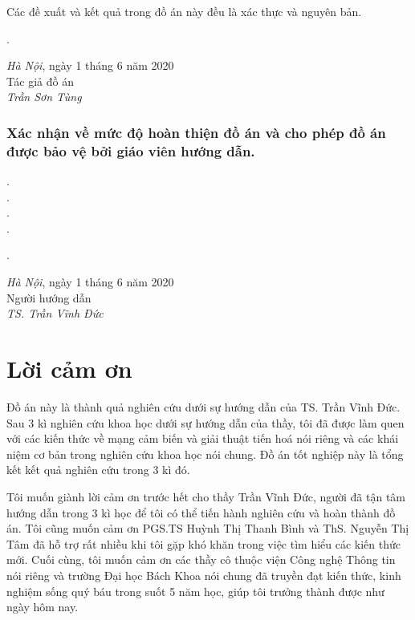 \documentclass{hust}
\begin{document}
Các đề xuất và kết quả trong đồ án này đều là xác thực và nguyên bản.
\begin{minipage}{0.5\textwidth}
	.
\end{minipage}
\begin{minipage}[t]{0.5\textwidth}
	
	
	
	\begin{center}
		\textit{Hà Nội}, ngày 1 tháng 6 năm 2020\\
		Tác giả đồ án\\[3cm]
		
		\textit{Trần Sơn Tùng}
	\end{center}
\end{minipage}
\subsection*{Xác nhận về mức độ hoàn thiện đồ án và cho phép đồ án được bảo vệ bởi giáo viên hướng dẫn.}
.\dotfill \\
.\dotfill \\ 
.\dotfill \\ 
.\dotfill \\
\begin{minipage}{0.5\textwidth}
	.
\end{minipage}
\begin{minipage}[t]{0.5\textwidth}
	
	\begin{center}
		\textit{Hà Nội}, ngày 1 tháng 6 năm 2020\\
		Người hướng dẫn\\[3cm]
		
		\textit{TS. Trần Vĩnh Đức}
	\end{center}
\end{minipage}

\pagebreak

\chapter*{Lời cảm ơn}
Đồ án này là thành quả nghiên cứu dưới sự hướng dẫn của TS. Trần Vĩnh Đức. Sau 3 kì nghiên cứu khoa học dưới sự hướng dẫn của thầy, tôi đã được làm quen với các kiến thức về mạng cảm biến và giải thuật tiến hoá nói riêng và các khái niệm cơ bản trong nghiên cứu khoa học nói chung. Đồ án tốt nghiệp này là tổng kết kết quả nghiên cứu trong 3 kì đó.


Tôi muốn giành lời cảm ơn trước hết cho thầy Trần Vĩnh Đức, người đã tận tâm hướng dẫn trong 3 kì học để tôi có thể tiến hành nghiên cứu và hoàn thành đồ án. Tôi cũng muốn cảm ơn PGS.TS Huỳnh Thị Thanh Bình và ThS. Nguyễn Thị Tâm đã hỗ trợ rất nhiều khi tôi gặp khó khăn trong việc tìm hiểu các kiến thức mới. Cuối cùng, tôi muốn cảm ơn các thầy cô thuộc viện Công nghệ Thông tin nói riêng và trường Đại học Bách Khoa nói chung đã truyền đạt kiến thức, kinh nghiệm sống quý báu trong suốt 5 năm học, giúp tôi trưởng thành được như ngày hôm nay.
\end{document}
